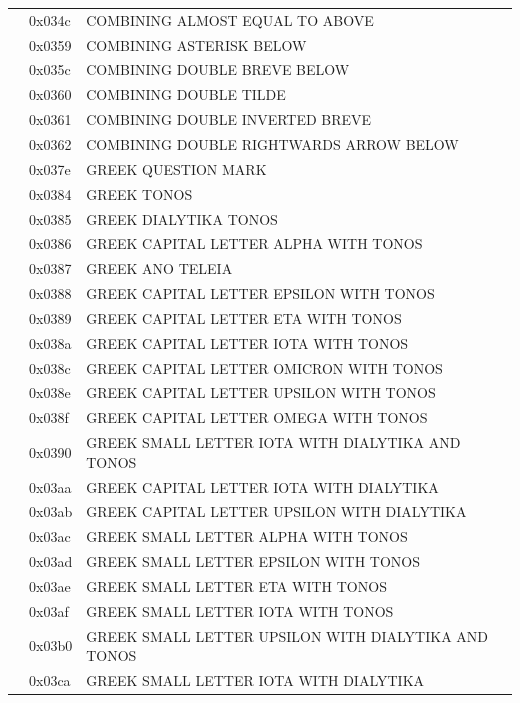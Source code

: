 \documentclass[12pt, twoside]{article}
\begin{document}
\begin{longtable}{L{1.0cm} L{2.0cm} >{\footnotesize}L{10cm}}
&0x034c&COMBINING ALMOST EQUAL TO ABOVE\\
&0x0359&COMBINING ASTERISK BELOW\\
&0x035c&COMBINING DOUBLE BREVE BELOW\\
&0x0360&COMBINING DOUBLE TILDE\\
&0x0361&COMBINING DOUBLE INVERTED BREVE\\
&0x0362&COMBINING DOUBLE RIGHTWARDS ARROW BELOW\\
&0x037e&GREEK QUESTION MARK\\
&0x0384&GREEK TONOS\\
&0x0385&GREEK DIALYTIKA TONOS\\
&0x0386&GREEK CAPITAL LETTER ALPHA WITH TONOS\\
&0x0387&GREEK ANO TELEIA\\
&0x0388&GREEK CAPITAL LETTER EPSILON WITH TONOS\\
&0x0389&GREEK CAPITAL LETTER ETA WITH TONOS\\
&0x038a&GREEK CAPITAL LETTER IOTA WITH TONOS\\
&0x038c&GREEK CAPITAL LETTER OMICRON WITH TONOS\\
&0x038e&GREEK CAPITAL LETTER UPSILON WITH TONOS\\
&0x038f&GREEK CAPITAL LETTER OMEGA WITH TONOS\\
&0x0390&GREEK SMALL LETTER IOTA WITH DIALYTIKA AND TONOS\\
&0x03aa&GREEK CAPITAL LETTER IOTA WITH DIALYTIKA\\
&0x03ab&GREEK CAPITAL LETTER UPSILON WITH DIALYTIKA\\
&0x03ac&GREEK SMALL LETTER ALPHA WITH TONOS\\
&0x03ad&GREEK SMALL LETTER EPSILON WITH TONOS\\
&0x03ae&GREEK SMALL LETTER ETA WITH TONOS\\
&0x03af&GREEK SMALL LETTER IOTA WITH TONOS\\
&0x03b0&GREEK SMALL LETTER UPSILON WITH DIALYTIKA AND TONOS\\
&0x03ca&GREEK SMALL LETTER IOTA WITH DIALYTIKA\\

\end{longtable}
\end{document}
